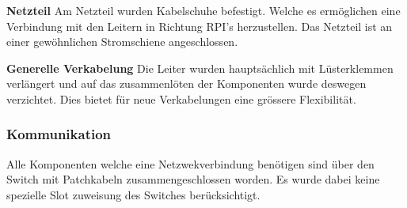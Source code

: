 \textbf{Netzteil}\newline
Am Netzteil wurden Kabelschuhe befestigt. Welche es ermöglichen eine Verbindung mit den Leitern in Richtung RPI's herzustellen. Das Netzteil ist an einer gewöhnlichen Stromschiene angeschlossen.

\textbf{Generelle Verkabelung}\newline
Die Leiter wurden hauptsächlich mit Lüsterklemmen verlängert und auf das zusammenlöten der Komponenten wurde deswegen verzichtet. Dies bietet für neue Verkabelungen eine grössere Flexibilität.

\subsubsection{Kommunikation}
Alle Komponenten welche eine Netzwekverbindung benötigen sind über den Switch mit Patchkabeln zusammengeschlossen worden. Es wurde dabei keine spezielle Slot zuweisung des Switches berücksichtigt.


